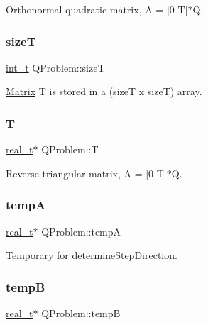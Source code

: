 Orthonormal quadratic matrix, A = \mbox{[}0 T\mbox{]}$\ast$Q\textquotesingle{}. \mbox{\label{class_q_problem_a1f41aef4290e816824bb3c4bf131f9c6}} 
\subsubsection{\texorpdfstring{sizeT}{sizeT}}
{\footnotesize\ttfamily \hyperlink{_types_8hpp_ab6fd6105e64ed14a0c9281326f05e623}{int\+\_\+t} Q\+Problem\+::sizeT\hspace{0.3cm}{\ttfamily [protected]}}

\hyperlink{class_matrix}{Matrix} T is stored in a (sizeT x sizeT) array. \mbox{\label{class_q_problem_a73598120773468b6d4d792d520fb1382}} 
\subsubsection{\texorpdfstring{T}{T}}
{\footnotesize\ttfamily \hyperlink{qp_o_a_s_e_s__wrapper_8h_a0d00e2b3dfadee81331bbb39068570c4}{real\+\_\+t}$\ast$ Q\+Problem\+::T\hspace{0.3cm}{\ttfamily [protected]}}

Reverse triangular matrix, A = \mbox{[}0 T\mbox{]}$\ast$Q\textquotesingle{}. \mbox{\label{class_q_problem_a6d03bae8b65750b03fb41f642e99ac83}} 
\subsubsection{\texorpdfstring{tempA}{tempA}}
{\footnotesize\ttfamily \hyperlink{qp_o_a_s_e_s__wrapper_8h_a0d00e2b3dfadee81331bbb39068570c4}{real\+\_\+t}$\ast$ Q\+Problem\+::tempA\hspace{0.3cm}{\ttfamily [protected]}}

Temporary for determine\+Step\+Direction. \mbox{\label{class_q_problem_a576bbbc7847e72d00700610fbd0d9ce5}} 
\subsubsection{\texorpdfstring{tempB}{tempB}}
{\footnotesize\ttfamily \hyperlink{qp_o_a_s_e_s__wrapper_8h_a0d00e2b3dfadee81331bbb39068570c4}{real\+\_\+t}$\ast$ Q\+Problem\+::tempB\hspace{0.3cm}{\ttfamily [protected]}}


